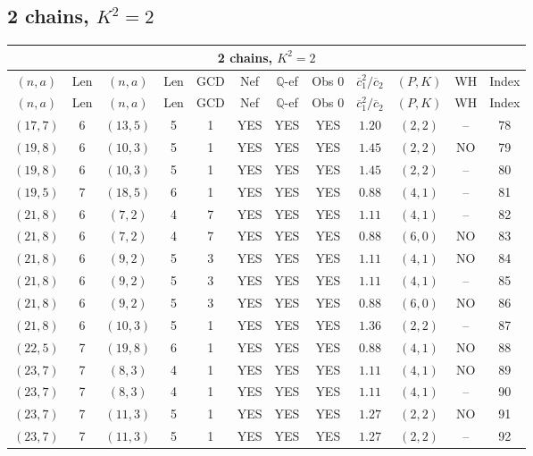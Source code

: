 \subsection{2 chains, $K^2 = 2$}
\begin{longtable}{|c|c|c|c|c|c|c|c|c|c|c|c|}
\hline
\multicolumn{12}{|c|}{2 chains, $K^2 = 2$}\\
\hline
$(n,a)$ & Len & $(n,a)$ & Len & GCD & Nef & $\mathbb Q$-ef & Obs 0 & $\overline c_1^2 / \overline c_2$ & $(P,K)$ & WH & Index\\
\hline
\endfirsthead

\hline
$(n,a)$ & Len & $(n,a)$ & Len & GCD & Nef & $\mathbb Q$-ef & Obs 0 & $\overline c_1^2 / \overline c_2$ & $(P,K)$ & WH & Index\\
\hline
\endhead
\hline
\endfoot

$(17,7)$ & 6 & $(13,5)$ & 5 & 1 & YES & YES & YES & $1.20$ & $(2,2)$ & -- & 78\\
$(19,8)$ & 6 & $(10,3)$ & 5 & 1 & YES & YES & YES & $1.45$ & $(2,2)$ & NO & 79\\
$(19,8)$ & 6 & $(10,3)$ & 5 & 1 & YES & YES & YES & $1.45$ & $(2,2)$ & -- & 80\\
$(19,5)$ & 7 & $(18,5)$ & 6 & 1 & YES & YES & YES & $0.88$ & $(4,1)$ & -- & 81\\
$(21,8)$ & 6 & $(7,2)$ & 4 & 7 & YES & YES & YES & $1.11$ & $(4,1)$ & -- & 82\\
$(21,8)$ & 6 & $(7,2)$ & 4 & 7 & YES & YES & YES & $0.88$ & $(6,0)$ & NO & 83\\
$(21,8)$ & 6 & $(9,2)$ & 5 & 3 & YES & YES & YES & $1.11$ & $(4,1)$ & NO & 84\\
$(21,8)$ & 6 & $(9,2)$ & 5 & 3 & YES & YES & YES & $1.11$ & $(4,1)$ & -- & 85\\
$(21,8)$ & 6 & $(9,2)$ & 5 & 3 & YES & YES & YES & $0.88$ & $(6,0)$ & NO & 86\\
$(21,8)$ & 6 & $(10,3)$ & 5 & 1 & YES & YES & YES & $1.36$ & $(2,2)$ & -- & 87\\
$(22,5)$ & 7 & $(19,8)$ & 6 & 1 & YES & YES & YES & $0.88$ & $(4,1)$ & NO & 88\\
$(23,7)$ & 7 & $(8,3)$ & 4 & 1 & YES & YES & YES & $1.11$ & $(4,1)$ & NO & 89\\
$(23,7)$ & 7 & $(8,3)$ & 4 & 1 & YES & YES & YES & $1.11$ & $(4,1)$ & -- & 90\\
$(23,7)$ & 7 & $(11,3)$ & 5 & 1 & YES & YES & YES & $1.27$ & $(2,2)$ & NO & 91\\
$(23,7)$ & 7 & $(11,3)$ & 5 & 1 & YES & YES & YES & $1.27$ & $(2,2)$ & -- & 92\\

\end{longtable}
